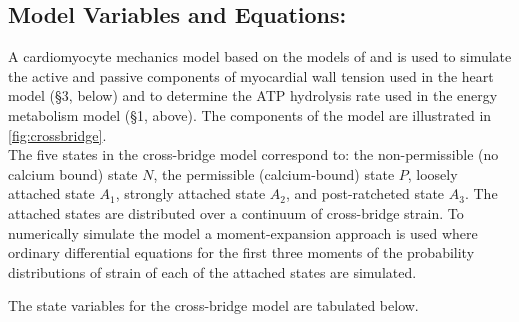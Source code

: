 \documentclass[fleqn,10pt]{physiome}
\begin{document}
\subsection{Model Variables and Equations:}

A cardiomyocyte mechanics model based on the models of \cite{Tewari2016a,Tewari2016b} and \cite{Campbell2018} is used to simulate the active and passive components of myocardial wall tension used in the heart model (§3, below) and to determine the ATP hydrolysis rate used in the energy metabolism model (§1, above). The components of the model are illustrated in  \autoref{fig:crossbridge}.\\



The five states in the cross-bridge model correspond to: the non-permissible (no calcium bound) state $N$, the permissible (calcium-bound) state $P$, loosely attached state $A_1$, strongly attached state $A_2$, and post-ratcheted state $A_3$. The attached states are distributed over a continuum of cross-bridge strain. To numerically simulate the model a moment-expansion approach is used where ordinary differential equations for the first three moments of the probability distributions of strain of each of the attached states are simulated. 

The state variables for the cross-bridge model are tabulated below.
\end{document}
